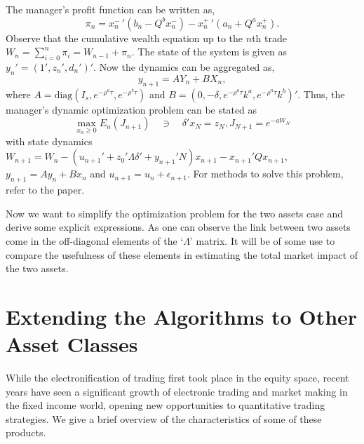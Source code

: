 The manager's profit function can be written as,
	\begin{equation}
	\pi_n= x_n^- \,' (b_n - Q^b x_n^-) - x_n^+\,' (a_n + Q^a x_n^+).
	\end{equation}
Observe that the cumulative wealth equation up to the $n$th trade $W_n= \sum_{i=0}^n \pi_i= W_{n-1} + \pi_n$. The state of the system is given as $y_n'= (1', z_n', d_n')'$. Now the dynamics can be aggregated as,
	\begin{equation}
	y_{n+1} = A Y_n + B X_n,
	\end{equation}
where $A= \text{diag}(I_s, e^{-\rho^a \tau}, e^{-\rho^b \tau})$ and $B= (0, -\delta, e^{-\rho^a\tau} k^a, e^{-\rho^n\tau} k^b)'$. Thus, the manager's dynamic optimization problem can be stated as
	\begin{equation}
	\max_{x_n \geq 0} E_n(J_{n+1}) \quad \ni \quad \delta' x_N= z_N, J_{N+1}= e^{-aW_N}
	\end{equation}
with state dynamics $W_{n+1}= W_n - (u_{n+1}' + z_0' \Lambda \delta' + y_{n+1}'N) x_{n+1} - x_{n+1}' Q x_{n+1}$, $y_{n+1}= Ay_n + Bx_n$ and $u_{n+1}= u_n + \epsilon_{n+1}$. For methods to solve this problem, refer to the paper. 


Now we want to simplify the optimization problem for the two assets case and derive some explicit expressions. As one can observe the link between two assets come in the off-diagonal elements of the `$\Lambda$' matrix. It will be of some use to compare the usefulness of these elements in estimating the total market impact of the two assets. 



\section{Extending the Algorithms to Other Asset Classes}

While the electronification of trading first took place in the equity space, recent years have seen a significant growth of electronic trading and market making in the fixed income world, opening new opportunities to quantitative trading strategies. We give a brief overview of the characteristics of some of these products. \twomedskip


